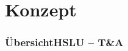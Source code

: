 \section{Konzept}

\author{Ervin Mazlagi\'c}

\begin{frame}
	\frametitle{Übersicht\hfill{}\footnotesize HSLU -- T\&A}
	
\end{frame}




